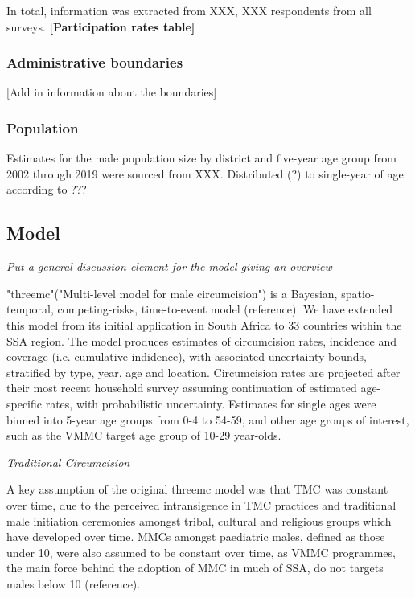 \documentclass[a4paper, 12pt]{article}
\begin{document}
In total, information was extracted from XXX, XXX respondents from all surveys.
\textbf{[Participation rates table]}

\subsubsection{Administrative boundaries}
\label{sec:org0995c95}

[Add in information about the boundaries] 

\subsubsection{Population}
\label{sec:org0d7d6e9}

Estimates for the male population size by district and five-year age group from 2002 through 2019 were sourced from XXX. 
Distributed (?) to single-year of age according to ??? 

\subsection{Model}
\label{sec:org38d457a}

\emph{Put a general discussion element for the model giving an overview}

"threemc"("Multi-level model for male circumcision") is a Bayesian, spatio-temporal, competing-risks, time-to-event model (reference). 
We have extended this model from its initial application in South Africa to 33 countries within the SSA region. 
The model produces estimates of circumcision rates, incidence and coverage (i.e. cumulative indidence), with associated uncertainty bounds, stratified by type, year, age and location.
Circumcision rates are projected after their most recent household survey assuming continuation of estimated age-specific rates, with probabilistic uncertainty. 
Estimates for single ages were binned into 5-year age groups from 0-4 to 54-59, and other age groups of interest, such as the VMMC target age group of 10-29 year-olds.  

\emph{Traditional Circumcision}

A key assumption of the original threemc model was that TMC was constant over time, due to the perceived intransigence in TMC practices and traditional male initiation ceremonies amongst tribal, cultural and religious groups which have developed over time. 
MMCs amongst paediatric males, defined as those under 10, were also assumed to be constant over time, as VMMC programmes, the main force behind the adoption of MMC in much of SSA, do not targets males below 10 (reference). 
\end{document}

